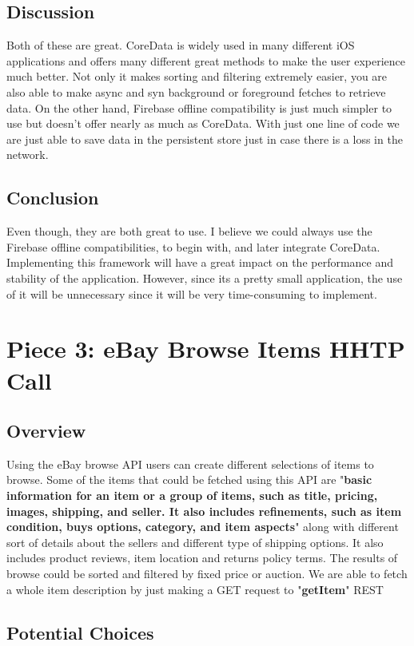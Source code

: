 \documentclass[onecolumn, draftclsnofoot,10pt, compsoc]{IEEEtran}
\begin{document}
\subsection{Discussion}
Both of these are great. CoreData is widely used in many different iOS applications and offers many different great methods to make the user experience much better. Not only it makes sorting and filtering extremely easier, you are also able to make async and syn background or foreground fetches to retrieve data. On the other hand, Firebase offline compatibility is just much simpler to use but doesn't offer nearly as much as CoreData. With just one line of code we are just able to save data in the persistent store just in case there is a loss in the network.

\subsection{Conclusion}
Even though, they are both great to use. I believe we could always use the Firebase offline compatibilities, to begin with, and later integrate CoreData. Implementing this framework will have a great impact on the performance and stability of the application. However, since its a pretty small application, the use of it will be unnecessary since it will be very time-consuming to implement.

\section{Piece 3: eBay Browse Items HHTP Call}
\subsection{Overview}
Using the eBay browse API users can create different selections of items to browse. Some of the items that could be fetched using this API are "\textbf{basic information for an item or a group of items, such as title, pricing, images, shipping, and seller. It also includes refinements, such as item condition, buys options, category, and item aspects}" along with different sort of details about the sellers and different type of shipping options. It also includes product reviews, item location and returns policy terms. The results of browse could be sorted and filtered by fixed price or auction. We are able to fetch a whole item description by just making a GET request to "\textbf{getItem}" REST

\subsection{Potential Choices}
\end{document}

